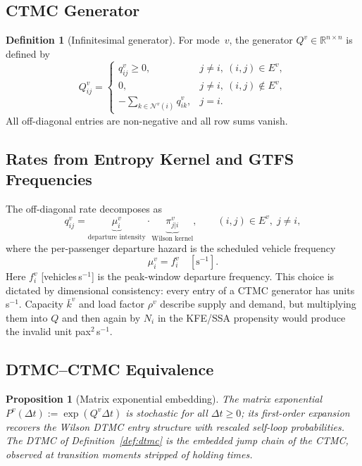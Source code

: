 \documentclass[12pt,a4paper]{article}
\theoremstyle{plain}
\newtheorem{proposition}[theorem]{Proposition}
\theoremstyle{definition}
\newtheorem{definition}[theorem]{Definition}
\theoremstyle{remark}
\begin{document}
\subsection{CTMC Generator}

\begin{definition}[Infinitesimal generator]
For mode~$v$, the generator $Q^v\in\mathbb{R}^{n\times n}$ is defined by
\begin{equation}
  Q^v_{ij} = \begin{cases}
    q^v_{ij}\ge0, & j\ne i,\ (i,j)\in E^v, \\
    0,             & j\ne i,\ (i,j)\notin E^v, \\
    -\displaystyle\sum_{k\in\mathcal{N}^v(i)} q^v_{ik}, & j=i.
  \end{cases}
\end{equation}
All off-diagonal entries are non-negative and all row sums vanish.
\end{definition}

\subsection{Rates from Entropy Kernel and GTFS Frequencies}
\label{sec:rates}

The off-diagonal rate decomposes as
\begin{equation}
  q^v_{ij} =
  \underbrace{\mu^v_i}_{\text{departure intensity}}\cdot
  \underbrace{\pi^v_{j|i}}_{\text{Wilson kernel}},
  \qquad (i,j)\in E^v,\;j\ne i,
  \label{eq:rate}
\end{equation}
where the per-passenger departure hazard is the scheduled vehicle frequency
\begin{equation}
  \mu^v_i = f^v_i
  \quad[\text{s}^{-1}].
  \label{eq:intensity}
\end{equation}
Here $f^v_i$ [vehicles\,s$^{-1}$] is the peak-window departure frequency.
This choice is dictated by dimensional consistency: every entry of a CTMC
generator has units s$^{-1}$.  Capacity $\bar{k}^v$ and load factor $\rho^v$ describe
supply and demand, but multiplying them into $Q$ and then again by $N_i$ in
the KFE/SSA propensity would produce the invalid unit pax$^2$\,s$^{-1}$.

\subsection{DTMC--CTMC Equivalence}

\begin{proposition}[Matrix exponential embedding]
The matrix exponential $P^v(\Delta t):=\exp(Q^v\Delta t)$ is stochastic for
all $\Delta t\ge0$; its first-order expansion recovers the Wilson DTMC entry
structure with rescaled self-loop probabilities.  The DTMC of
Definition~\ref{def:dtmc} is the \emph{embedded jump chain} of the CTMC,
observed at transition moments stripped of holding times.
\end{proposition}
\end{document}
